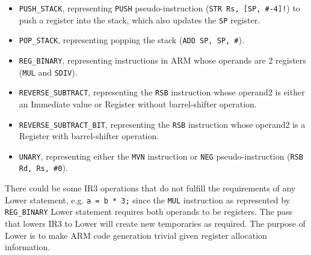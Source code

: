\documentclass[nonacm, acmsmall, screen, 10pt]{acmart}
\begin{document}
\begin{itemize}
  \item \texttt{PUSH\_STACK}, representing \texttt{PUSH} pseudo-instruction (\texttt{STR Rs, [SP, \#-4]!}) to push a register into the stack, which also updates the \texttt{SP} register.
  \item \texttt{POP\_STACK}, representing popping the stack (\texttt{ADD SP, SP, \#<number of bytes>}).
  \item \texttt{REG\_BINARY}, representing instructions in ARM whose operands are 2 registers (\texttt{MUL} and \texttt{SDIV}).
  \item \texttt{REVERSE\_SUBTRACT}, representing the \texttt{RSB} instruction whose operand2 is either an Immediate value or Register without barrel-shifter operation.
  \item \texttt{REVERSE\_SUBTRACT\_BIT}, representing the \texttt{RSB} instruction whose operand2 is a Register with barrel-shifter operation.
  \item \texttt{UNARY}, representing either the \texttt{MVN} instruction or \texttt{NEG} pseudo-instruction (\texttt{RSB Rd, Rs, \#0}).
\end{itemize}

There could be some IR3 operations that do not fulfill the requirements of any Lower statement, e.g. \texttt{a = b * 3;} since the \texttt{MUL} instruction as represented by \texttt{REG\_BINARY} Lower statement requires both operands to be registers.
The pass that lowers IR3 to Lower will create new temporaries as required.
The purpose of Lower is to make ARM code generation trivial given register allocation information.
\end{document}
